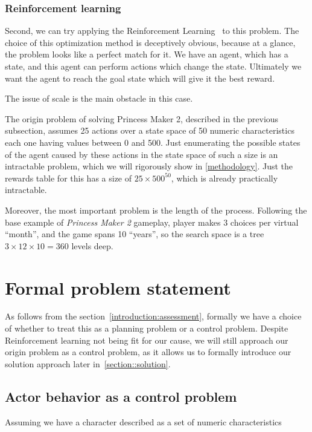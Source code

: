 \documentclass[12pt, a4paper]{article}
\begin{document}
  \subsubsection{Reinforcement learning}
	Second, we can try applying the Reinforcement Learning~\cite{sutton2018reinforcement} to this problem.
	The choice of this optimization method is deceptively obvious, because at a glance, the problem looks like a perfect match for it.
	We have an agent, which has a state, and this agent can perform actions which change the state.
	Ultimately we want the agent to reach the goal state which will give it the best reward.
	
	The issue of scale is the main obstacle in this case.

	The origin problem of solving Princess Maker 2, described in the previous subsection,  assumes 25 actions over a state space of 50 numeric characteristics each one having values between 0 and 500.
	Just enumerating the possible states of the agent caused by these actions in the state space of such a size is an intractable problem, which we will rigorously show in \ref{methodology}.
	Just the rewards table for this has a size of $25 \times 500^{50}$, which is already practically intractable.
	
	Moreover, the most important problem is the length of the process.
	Following the base example of \textit{Princess Maker 2} gameplay, player makes 3 choices per virtual ``month'', and the game spans 10 ``years'', so the search space is a tree $3 \times 12 \times 10 = 360$ levels deep.
	
	\section{Formal problem statement}\label{problem-statement}

	As follows from the section~\ref{introduction:assessment}, formally we have a choice of whether to treat this as a planning problem or a control problem.
	Despite Reinforcement learning not being fit for our cause, we will still approach our origin problem as a control problem, as it allows us to formally introduce our solution approach later in~\ref{section::solution}.

	\subsection{Actor behavior as a control problem}

	Assuming we have a character described as a set of numeric characteristics
	
\end{document}
